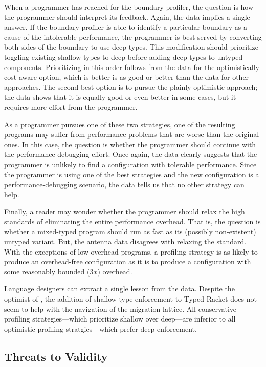 When a programmer has reached for the boundary profiler, the question is how the
programmer should interpret its feedback. Again, the data implies a single
answer.  If the boundary profiler is able to identify a particular boundary as a
cause of the intolerable performance, the programmer is best served by
converting both sides of the boundary to use deep types. This modification
should prioritize toggling existing shallow types to deep before adding deep
types to untyped components. Prioritizing in this order follows from the data
for the optimistically cost-aware option, which is better is as good or better
than the data for other approaches. The second-best option is to pursue the
plainly optimistic approach; the data shows that it is equally good or even
better in some cases, but it requires more effort from the programmer. 

As a programmer pursues one of these two strategies, one of the resulting
programs may suffer from performance problems that are worse than the original
ones. In this case, the question is whether the programmer should continue with
the performance-debugging effort. Once again, the data clearly suggests that the
programmer is unlikely to find a configuration with tolerable performance. Since
the programmer is using one of the best strategies and the new
configuration is a performance-debugging scenario, the data tells us that no
other strategy can help.

Finally, a reader may wonder whether the programmer should relax the high
standards of eliminating the entire performance overhead.  That is, the question
is whether a mixed-typed program should run as fast as its (possibly
non-existent) untyped variant. But, the antenna data disagrees with relaxing the
standard. With the exceptions of low-overhead programs, a profiling strategy is
as likely to produce an overhead-free configuration as it is to produce a
configuration with some reasonably bounded ($3x$) overhead. 

Language designers can extract a single lesson from the data. Despite the
optimist of \citet{g-deep-shallow}, the addition of shallow type enforcement to
Typed Racket does not seem to help with the navigation of the migration
lattice. All conservative profiling strategies---which prioritize shallow over
deep---are inferior to all optimistic profiling stratgies---which prefer deep
enforcement. 

\subsection{Threats to Validity} \label{subsec:threats}


